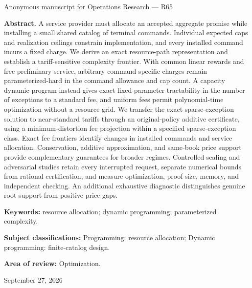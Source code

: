 \documentclass[11pt,letterpaper]{article}
\theoremstyle{definition}\newtheorem{remark}[theorem]{Remark}
\begin{document}
\hypersetup{pageanchor=false}
\begin{titlepage}
\vspace{0.25in}Anonymous manuscript for Operations Research --- R65\par\vspace{0.2in}
\begin{minipage}{\textwidth}\textbf{Abstract.} A service provider must allocate an accepted aggregate promise while installing a small shared catalog of terminal commands. Individual expected caps and realization ceilings constrain implementation, and every installed command incurs a fixed charge. We derive an exact resource-path representation and establish a tariff-sensitive complexity frontier. With common linear rewards and free preliminary service, arbitrary command-specific charges remain parameterized-hard in the command allowance and cap count. A capacity dynamic program instead gives exact fixed-parameter tractability in the number of exceptions to a standard fee, and uniform fees permit polynomial-time optimization without a resource grid. We transfer the exact sparse-exception solution to near-standard tariffs through an original-policy additive certificate, using a minimum-distortion fee projection within a specified sparse-exception class. Exact fee frontiers identify changes in installed commands and service allocation. Conservation, additive approximation, and same-book price support provide complementary guarantees for broader regimes. Controlled scaling and adversarial studies retain every interrupted request, separate numerical bounds from rational certification, and measure optimization, proof size, memory, and independent checking. An additional exhaustive diagnostic distinguishes genuine root support from positive price gaps.
\par\vspace{0.15in}\textbf{Keywords:} resource allocation; dynamic programming; parameterized complexity.
\par\vspace{0.1in}\textbf{Subject classifications:} Programming: resource allocation; Dynamic programming: finite-catalog design.
\par\vspace{0.1in}\textbf{Area of review:} Optimization.\end{minipage}\vfill September 27, 2026\end{titlepage}
\hypersetup{pageanchor=true}
\end{document}
